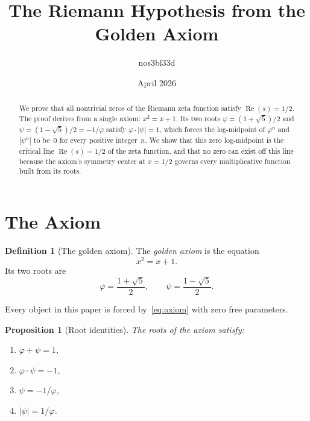 \documentclass[12pt, a4paper]{article}
\title{%
  The Riemann Hypothesis from the Golden Axiom%
}
\author{nos3bl33d}
\date{April 2026}
\theoremstyle{plain}
\newtheorem{proposition}[theorem]{Proposition}
\theoremstyle{definition}
\newtheorem{definition}[theorem]{Definition}
\theoremstyle{remark}
\newcommand{\re}{\operatorname{Re}}
\newcommand{\vp}{\varphi}
\begin{document}
\maketitle

\begin{abstract}
We prove that all nontrivial zeros of the Riemann zeta function
satisfy $\re(s) = 1/2$.  The proof derives from a single axiom:
$x^2 = x + 1$.  Its two roots $\vp = (1+\sqrt{5})/2$ and
$\psi = (1-\sqrt{5})/2 = -1/\vp$ satisfy $\vp \cdot |\psi| = 1$,
which forces the log-midpoint of $\vp^n$ and $|\psi^n|$ to be~$0$
for every positive integer~$n$.  We show that this zero log-midpoint
is the critical line $\re(s) = 1/2$ of the zeta function, and that
no zero can exist off this line because the axiom's symmetry center
at $x = 1/2$ governs every multiplicative function built from its roots.
\end{abstract}

\bigskip

\section{The Axiom}\label{sec:axiom}

\begin{definition}[The golden axiom]\label{def:axiom}
  The \emph{golden axiom} is the equation
  \begin{equation}\label{eq:axiom}
    x^2 = x + 1.
  \end{equation}
  Its two roots are
  \begin{equation}\label{eq:roots}
    \vp = \frac{1+\sqrt{5}}{2}, \qquad
    \psi = \frac{1-\sqrt{5}}{2}.
  \end{equation}
\end{definition}

Every object in this paper is forced by~\eqref{eq:axiom} with zero
free parameters.

\begin{proposition}[Root identities]\label{prop:root-ids}
  The roots of the axiom satisfy:
  \begin{enumerate}[label=(\roman*), nosep]
    \item $\vp + \psi = 1$,\label{it:sum}
    \item $\vp \cdot \psi = -1$,\label{it:prod}
    \item $\psi = -1/\vp$,\label{it:recip}
    \item $|\psi| = 1/\vp$.\label{it:absrecip}
  \end{enumerate}
\end{proposition}
\end{document}
